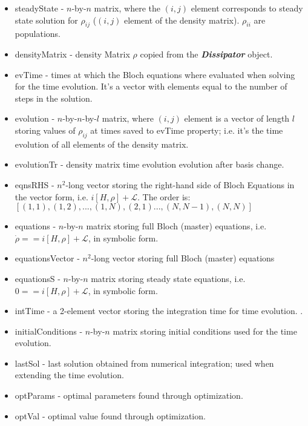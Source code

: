 \documentclass{article}
\numberwithin{equation}{section}
\numberwithin{figure}{section}
\numberwithin{table}{section}
\newcommand\codevar[1]{\ttfamily #1\rmfamily}
\newcommand\codeclass[1]{\ttfamily\textbf{\textit{#1}}\rmfamily}
\begin{document}
\begin{itemize}

\item \codevar{steadyState} - $n$-by-$n$ matrix, where the $(i,j)$ element corresponds to steady state solution for $\rho_{ij}$ ($(i,j)$ element of the density matrix). $\rho_{ii}$ are populations.

\item \codevar{densityMatrix} - density Matrix $\rho$ copied from the \codeclass{Dissipator} object.

\item \codevar{evTime} - times at which the Bloch equations where evaluated when solving for the time evolution. It's a vector with elements equal to the number of steps in the solution.

\item \codevar{evolution} - $n$-by-$n$-by-$l$ matrix, where $(i,j)$ element is a vector of length $l$ storing values of $\rho_{ij}$ at times saved to \codevar{evTime} property; i.e. it's the time evolution of all elements of the density matrix.

\item \codevar{evolutionTr} - density matrix time evolution \codevar{evolution} after basis change.

\item \codevar{eqnsRHS} - $n^2$-long vector storing the right-hand side of Bloch Equations in the vector form, i.e. $i[H,\rho]+\mathcal{L}$. The order is: $[(1,1),(1,2),...,(1,N),(2,1)...,(N,N-1),(N,N)]$
        
\item \codevar{equations} - $n$-by-$n$ matrix storing full Bloch (master) equations, i.e. $\dot{\rho}==i[H,\rho]+\mathcal{L}$, in symbolic form.

\item \codevar{equationsVector} - $n^2$-long vector storing full Bloch (master) equations

\item \codevar{equationsS} - $n$-by-$n$ matrix storing steady state equations, i.e. $0==i[H,\rho]+\mathcal{L}$, in symbolic form.

\item \codevar{intTime} - a 2-element vector storing the integration time for time evolution. .

\item \codevar{initialConditions} - $n$-by-$n$ matrix storing initial conditions used for the time evolution.

\item \codevar{lastSol} - last solution obtained from numerical integration; used when extending the time evolution.

\item \codevar{optParams} - optimal parameters found through optimization.

\item \codevar{optVal} - optimal value found through optimization.

\end{itemize}
\end{document}
